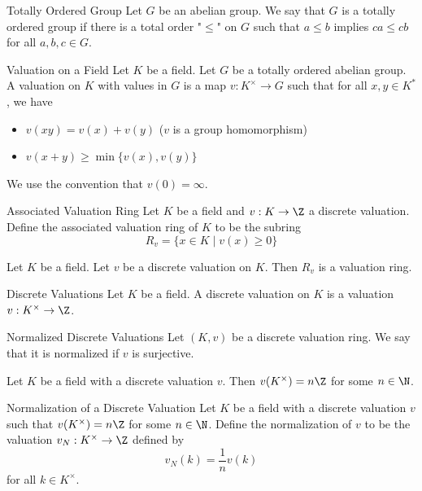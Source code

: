 \documentclass[a4paper]{article}
\begin{document}
\begin{defn}{Totally Ordered Group}{} Let $G$ be an abelian group. We say that $G$ is a totally ordered group if there is a total order "$\leq$" on $G$ such that $a\leq b$ implies $ca\leq cb$ for all $a,b,c\in G$. 
\end{defn}

\begin{defn}{Valuation on a Field}{} Let $K$ be a field. Let $G$ be a totally ordered abelian group. A valuation on $K$ with values in $G$ is a map $v:K^\times\to G$ such that for all $x,y\in K^\ast$, we have 
\begin{itemize}
\item $v(xy)=v(x)+v(y)$ ($v$ is a group homomorphism)
\item $v(x+y)\geq\min\{v(x),v(y)\}$
\end{itemize}
We use the convention that $v(0)=\infty$. 
\end{defn}

\begin{defn}{Associated Valuation Ring}{} Let $K$ be a field and $v:K\to\Z$ a discrete valuation. Define the associated valuation ring of $K$ to be the subring $$R_v=\{x\in K\;|\;v(x)\geq 0\}$$
\end{defn}

\begin{lmm}{}{} Let $K$ be a field. Let $v$ be a discrete valuation on $K$. Then $R_v$ is a valuation ring. 
\end{lmm}

\begin{defn}{Discrete Valuations}{} Let $K$ be a field. A discrete valuation on $K$ is a valuation $v:K^\times\to\Z$. 
\end{defn}

\begin{defn}{Normalized Discrete Valuations}{} Let $(K,v)$ be a discrete valuation ring. We say that it is normalized if $v$ is surjective. 
\end{defn}

\begin{lmm}{}{} Let $K$ be a field with a discrete valuation $v$. Then $v(K^\times)=n\Z$ for some $n\in\N$. 
\end{lmm}

\begin{lmm}{Normalization of a Discrete Valuation}{} Let $K$ be a field with a discrete valuation $v$ such that $v(K^\times)=n\Z$ for some $n\in\N$. Define the normalization of $v$ to be the valuation $v_N:K^\times\to\Z$ defined by $$v_N(k)=\frac{1}{n}v(k)$$ for all $k\in K^\times$. 
\end{lmm}
\end{document}
